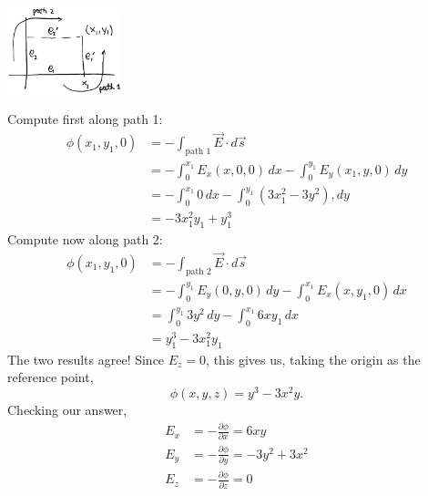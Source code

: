\documentclass{esg8022pset}
\begin{document}
\begin{solution}
  \begin{center}\includegraphics[width=0.25\textwidth]{ps02_sol_04}\end{center}
  
  Compute first along path 1:
  \begin{align*}
    \phi(x_1, y_1, 0) & = -\int_{\text{path 1}} \vec E \cdot d\vec s \\
      & = -\int_0^{x_1} E_x(x, 0, 0)\,dx - \int_0^{y_1} E_y(x_1, y, 0)\,dy \\
      & = -\int_0^{x_1} 0\,dx - \int_0^{y_1} (3x_1^2 - 3y^2),dy \\
      & = -3x_1^2 y_1 + y_1^3
  \end{align*}
  Compute now along path 2:
  \begin{align*}
    \phi(x_1, y_1, 0) & = -\int_{\text{path 2}} \vec E \cdot d\vec s \\
      & = -\int_0^{y_1} E_y(0, y, 0)\,dy - \int_0^{x_1} E_x(x, y_1, 0)\,dx \\
      & = \int_0^{y_1} 3y^2\,dy - \int_0^{x_1}6xy_1\,dx \\
      & = y_1^3 - 3x_1^2y_1
  \end{align*}
  The two results agree!  Since $E_z = 0$, this gives us, taking the origin as the reference point,
  $$\phi(x, y, z) = y^3 - 3x^2 y.$$
  Checking our answer,
  \begin{align*}
    E_x & = -\frac{\partial \phi}{\partial x} = 6xy \\
    E_y & = -\frac{\partial \phi}{\partial y} = -3y^2 + 3x^2 \\
    E_z & = -\frac{\partial \phi}{\partial z} = 0
  \end{align*}

\end{solution}
\end{document}
